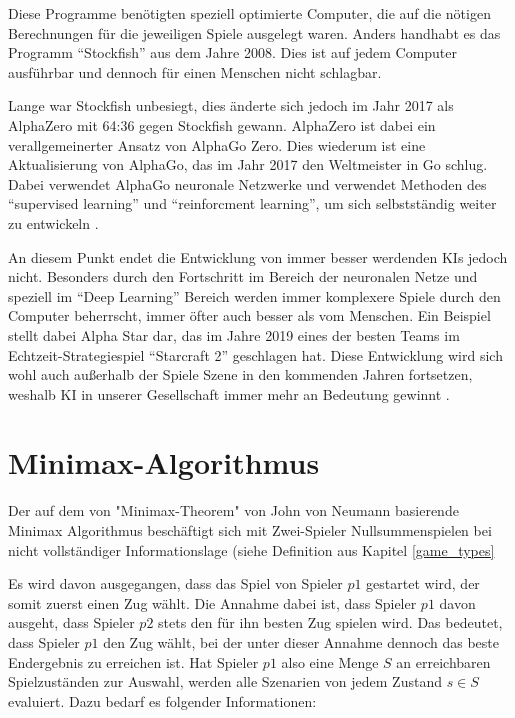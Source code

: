
Diese Programme benötigten speziell optimierte Computer, die auf die nötigen Berechnungen für die jeweiligen Spiele ausgelegt waren. Anders handhabt es das Programm ``Stockfish'' aus dem Jahre 2008. Dies ist auf jedem Computer ausführbar und dennoch für einen Menschen nicht schlagbar.

Lange war Stockfish unbesiegt, dies änderte sich jedoch im Jahr 2017 als AlphaZero mit 64:36 gegen Stockfish gewann. AlphaZero ist dabei ein verallgemeinerter Ansatz von AlphaGo Zero. Dies wiederum ist eine Aktualisierung von AlphaGo, das im Jahr 2017 den Weltmeister in Go schlug. Dabei verwendet AlphaGo neuronale Netzwerke und verwendet Methoden des ``supervised learning'' und ``reinforcment learning'', um sich selbstständig weiter zu entwickeln \cite{Fischer}.


An diesem Punkt endet die Entwicklung von immer besser werdenden KIs jedoch nicht. Besonders durch den Fortschritt im Bereich der neuronalen Netze und speziell im ``Deep Learning'' Bereich werden immer komplexere Spiele durch den Computer beherrscht, immer öfter auch besser als vom Menschen. Ein Beispiel stellt dabei Alpha Star dar, das im Jahre 2019 eines der besten Teams im Echtzeit-Strategiespiel ``Starcraft 2'' geschlagen hat. Diese Entwicklung wird sich wohl auch außerhalb der Spiele Szene in den kommenden Jahren fortsetzen, weshalb KI in unserer Gesellschaft immer mehr an Bedeutung gewinnt  \cite{OriolVinyalsIgorBabuschkinJunyoungChungMichaelMathieuMaxJaderbergWojtekCzarneckiAndrewDudzikAjaHuangPetkoGeorgievRichardPowellTimoEwaldsDanHorganManuelKroissIvoDanihelkaJohnAgapiouJunhyukOhValentinDalibard}.


\section{Minimax-Algorithmus}\label{minimax}

Der auf dem von "Minimax-Theorem" von John von Neumann basierende Minimax Algorithmus beschäftigt sich mit Zwei-Spieler Nullsummenspielen bei nicht vollständiger Informationslage (siehe Definition aus Kapitel \ref{game_types}

Es wird davon ausgegangen, dass das Spiel von Spieler $p1$ gestartet wird, der somit zuerst einen Zug wählt. Die Annahme dabei ist, dass Spieler $p1$ davon ausgeht, dass Spieler $p2$ stets den für ihn besten Zug spielen wird. Das bedeutet, dass Spieler $p1$ den Zug wählt, bei der unter dieser Annahme dennoch das beste Endergebnis zu erreichen ist. Hat Spieler $p1$ also eine Menge $S$ an erreichbaren Spielzuständen zur Auswahl, werden alle Szenarien von jedem Zustand $s \in S$ evaluiert. Dazu bedarf es folgender Informationen:

